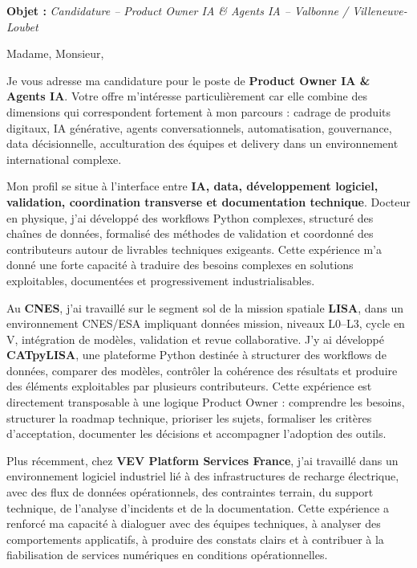 \documentclass[11pt,a4paper]{altacv}
\begin{document}
\makecvheader
\vspace{-0.6cm}

\vspace{-0.4cm}

{\color{accent}\textbf{Objet :}} \textit{Candidature -- Product Owner IA \& Agents IA -- Valbonne / Villeneuve-Loubet}

{\color{body}

Madame, Monsieur,

Je vous adresse ma candidature pour le poste de \textbf{Product Owner IA \& Agents IA}. Votre offre m'intéresse particulièrement car elle combine des dimensions qui correspondent fortement à mon parcours : cadrage de produits digitaux, IA générative, agents conversationnels, automatisation, gouvernance, data décisionnelle, acculturation des équipes et delivery dans un environnement international complexe.

Mon profil se situe à l'interface entre \textbf{IA, data, développement logiciel, validation, coordination transverse et documentation technique}. Docteur en physique, j'ai développé des workflows Python complexes, structuré des chaînes de données, formalisé des méthodes de validation et coordonné des contributeurs autour de livrables techniques exigeants. Cette expérience m'a donné une forte capacité à traduire des besoins complexes en solutions exploitables, documentées et progressivement industrialisables.

Au \textbf{CNES}, j'ai travaillé sur le segment sol de la mission spatiale \textbf{LISA}, dans un environnement CNES/ESA impliquant données mission, niveaux L0--L3, cycle en V, intégration de modèles, validation et revue collaborative. J'y ai développé \textbf{CATpyLISA}, une plateforme Python destinée à structurer des workflows de données, comparer des modèles, contrôler la cohérence des résultats et produire des éléments exploitables par plusieurs contributeurs. Cette expérience est directement transposable à une logique Product Owner : comprendre les besoins, structurer la roadmap technique, prioriser les sujets, formaliser les critères d'acceptation, documenter les décisions et accompagner l'adoption des outils.

Plus récemment, chez \textbf{VEV Platform Services France}, j'ai travaillé dans un environnement logiciel industriel lié à des infrastructures de recharge électrique, avec des flux de données opérationnels, des contraintes terrain, du support technique, de l'analyse d'incidents et de la documentation. Cette expérience a renforcé ma capacité à dialoguer avec des équipes techniques, à analyser des comportements applicatifs, à produire des constats clairs et à contribuer à la fiabilisation de services numériques en conditions opérationnelles.

}
\end{document}
